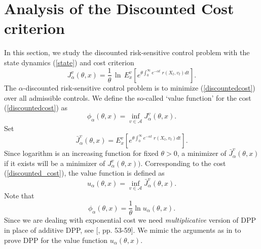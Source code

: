 \documentclass[11pt]{amsart}
\numberwithin{equation}{section}
\begin{document}
\section{ Analysis of the Discounted  Cost criterion }
In this section, we  study the  discounted  risk-sensitive control problem
with the state dynamics  (\ref{state}) and cost criterion 
\[
J_{\alpha}^v (\theta,x)= \frac{1}{\theta} \, \ln \,
 E_x^v\left[ e^{\theta\int_{0}^{\infty} e^{-\alpha t} \; r(X_t,v_t) dt}\right].
\]
The $\alpha$-discounted  risk-sensitive control problem is to minimize (\ref{discountedcost}) over all admissible 
controls. We define the so-called `value function' for the cost 
(\ref{discountedcost}) as
\begin{equation}\label{discounted_risk_value}
 \phi_{\alpha}(\theta,x)= \inf_{v\in\mathcal A} J_{\alpha}^v (\theta,x).
\end{equation}
Set
\begin{equation}\label{discounted_cost}
\bar J_{\alpha}^v (\theta,x)= E_x^v\left[ e^{\theta\int_{0}^{\infty} e^{-\alpha t} \; r(X_t,v_t) dt}\right].  
\end{equation}
Since logarithm is an increasing function for fixed $\theta>0$, a minimizer of $\bar J_{\alpha}^v (\theta,x)$ if it exists will be a
minimizer of $J_{\alpha}^v (\theta,x))$. Corresponding to the cost (\ref{discounted_cost}), the value function is defined as 
\begin{equation}\label{discounted_value}
 u_{\alpha}(\theta,x)= \inf_{v\in \mathcal A} \bar J_{\alpha}^v (\theta,x).
\end{equation}
Note that 
\begin{equation}\label{relation}
 \phi_{\alpha}(\theta,x)= \frac{1}{\theta} \ln u_{\alpha}(\theta,x) .
\end{equation}
Since we are dealing with exponential cost we need {\it multiplicative} version of DPP in place of  
additive DPP, see [\cite{borkar}, pp. 53-59].
We mimic the arguments as in \cite{menaldi_robin} to prove DPP for the value function $u_{\alpha}(\theta,x)$.
 
\end{document}

